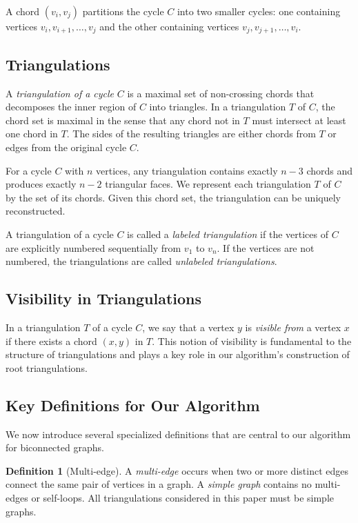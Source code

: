 \documentclass[12pt,a4paper]{article}
\theoremstyle{definition}
\newtheorem{definition}{Definition}
\theoremstyle{remark}
\begin{document}
A chord $(v_i,v_j)$ partitions the cycle $C$ into two smaller cycles: one containing vertices $v_i,v_{i+1},\ldots,v_j$ and the other containing vertices $v_j,v_{j+1},\ldots,v_i$.

\subsection{Triangulations}

A \emph{triangulation of a cycle} $C$ is a maximal set of non-crossing chords that decomposes the inner region of $C$ into triangles. In a triangulation $T$ of $C$, the chord set is maximal in the sense that any chord not in $T$ must intersect at least one chord in $T$. The sides of the resulting triangles are either chords from $T$ or edges from the original cycle $C$.

For a cycle $C$ with $n$ vertices, any triangulation contains exactly $n-3$ chords and produces exactly $n-2$ triangular faces. We represent each triangulation $T$ of $C$ by the set of its chords. Given this chord set, the triangulation can be uniquely reconstructed.

A triangulation of a cycle $C$ is called a \emph{labeled triangulation} if the vertices of $C$ are explicitly numbered sequentially from $v_1$ to $v_n$. If the vertices are not numbered, the triangulations are called \emph{unlabeled triangulations}.

\subsection{Visibility in Triangulations}

In a triangulation $T$ of a cycle $C$, we say that a vertex $y$ is \emph{visible from} a vertex $x$ if there exists a chord $(x,y)$ in $T$. This notion of visibility is fundamental to the structure of triangulations and plays a key role in our algorithm's construction of root triangulations.

\subsection{Key Definitions for Our Algorithm}

We now introduce several specialized definitions that are central to our algorithm for biconnected graphs.

\begin{definition}[Multi-edge]
A \emph{multi-edge} occurs when two or more distinct edges connect the same pair of vertices in a graph. A \emph{simple graph} contains no multi-edges or self-loops. All triangulations considered in this paper must be simple graphs.
\end{definition}
\end{document}

